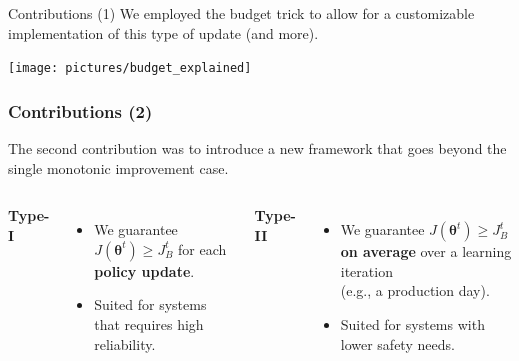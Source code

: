 \documentclass{beamer}
\makeatletter
\newcommand{\vtheta}{{\boldsymbol{\theta}}}
\DeclareRobustCommand{\eg}{e.g.,\@\xspace}
\newcommand{\jbase}[1][t]{{J_{B}^{#1}}}
\makeatother
\begin{document}
\begin{frame}{Contributions (1)}
We employed the budget trick to allow for a customizable implementation of this type of update (and more).
\vfill

\centering
\texttt{[image: pictures/budget\_explained]}
\end{frame}




\begin{frame}
\frametitle{Contributions (2)}
The second contribution was to introduce a new framework that goes beyond the single monotonic improvement case.
\vspace{0.3cm}
\begin{columns}[T]
\centering
\textbf{Type-I}
\vspace{0.3cm}
\begin{itemize}
\item We guarantee $J(\vtheta^t) \geq \jbase$ for each \textbf{policy update}.
\item Suited for systems that requires high reliability.
\end{itemize}
\centering
\textbf{Type-II}
\vspace{0.3cm}
\begin{itemize}
\item We guarantee $J(\vtheta^t)\geq \jbase$  \textbf{on average} over a learning iteration \\ (\eg a production day).
\item Suited for systems with lower safety needs.
\end{itemize}
\end{columns}

\end{frame}

%
%
\end{document}
